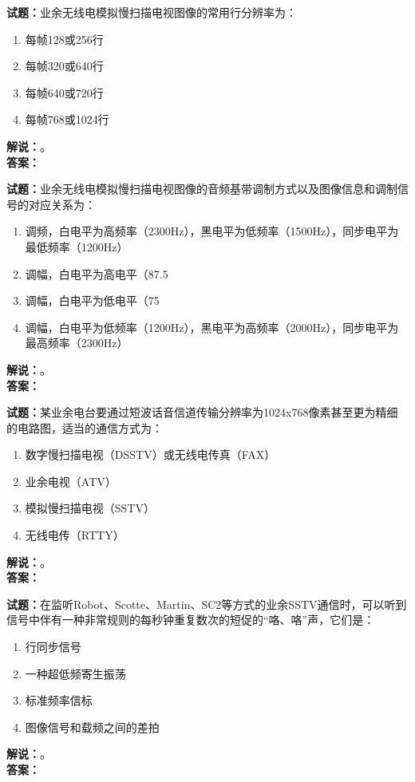 \documentclass{ctexbook}
\begin{document}
\bigskip

\noindent\textbf{试题：}业余无线电模拟慢扫描电视图像的常用行分辨率为：
\begin{enumerate}[leftmargin=3em]
  \item 每帧128或256行
  \item 每帧320或640行
  \item 每帧640或720行
  \item 每帧768或1024行
\end{enumerate}
\noindent\textbf{解说：}\textbf{}。\\\noindent\textbf{答案：}

\bigskip

\noindent\textbf{试题：}业余无线电模拟慢扫描电视图像的音频基带调制方式以及图像信息和调制信号的对应关系为：
\begin{enumerate}[leftmargin=3em]
  \item 调频，白电平为高频率（2300Hz），黑电平为低频率（1500Hz），同步电平为最低频率（1200Hz）
  \item 调幅，白电平为高电平（87.5%
  \item 调幅，白电平为低电平（75%
  \item 调幅，白电平为低频率（1200Hz），黑电平为高频率（2000Hz），同步电平为最高频率（2300Hz）
\end{enumerate}
\noindent\textbf{解说：}\textbf{}。\\\noindent\textbf{答案：}

\bigskip

\noindent\textbf{试题：}某业余电台要通过短波话音信道传输分辨率为1024x768像素甚至更为精细的电路图，适当的通信方式为：
\begin{enumerate}[leftmargin=3em]
  \item 数字慢扫描电视（DSSTV）或无线电传真（FAX）
  \item 业余电视（ATV）
  \item 模拟慢扫描电视（SSTV）
  \item 无线电传（RTTY）
\end{enumerate}
\noindent\textbf{解说：}\textbf{}。\\\noindent\textbf{答案：}

\bigskip

\noindent\textbf{试题：}在监听Robot、Scotte、Martin、SC2等方式的业余SSTV通信时，可以听到信号中伴有一种非常规则的每秒钟重复数次的短促的“咯、咯”声，它们是：
\begin{enumerate}[leftmargin=3em]
  \item 行同步信号
  \item 一种超低频寄生振荡
  \item 标准频率信标
  \item 图像信号和载频之间的差拍
\end{enumerate}
\noindent\textbf{解说：}\textbf{}。\\\noindent\textbf{答案：}
\end{document}
